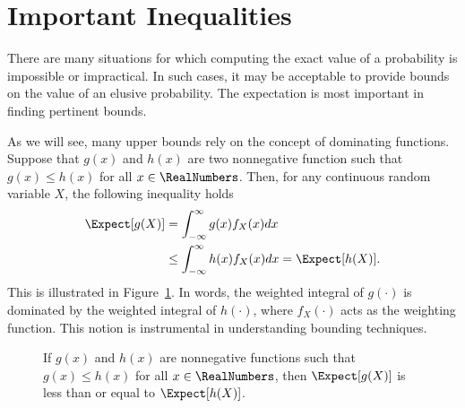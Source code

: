 \section{Important Inequalities}

There are many situations for which computing the exact value of a probability is impossible or impractical.
In such cases, it may be acceptable to provide bounds on the value of an elusive probability.
The expectation is most important in finding pertinent bounds.

As we will see, many upper bounds rely on the concept of dominating functions.
Suppose that $g(x)$ and $h(x)$ are two nonnegative function such that $g(x) \leq h(x)$ for all $x \in \RealNumbers$.
Then, for any continuous random variable $X$, the following inequality holds
\begin{equation*}
\begin{split}
\Expect [g(X)] &= \int_{-\infty}^{\infty} g(x) f_X(x) dx \\
&\leq \int_{-\infty}^{\infty} h(x) f_X (x) dx
= \Expect [h(X)] .
\end{split}
\end{equation*}
This is illustrated in Figure~\ref{figure:DominatingFcn}.
In words, the weighted integral of $g(\cdot)$ is dominated by the weighted integral of $h(\cdot)$, where $f_X (\cdot)$ acts as the weighting function.
This notion is instrumental in understanding bounding techniques.

\begin{figure}[thb]
\begin{center}
\end{center}
\caption{If $g(x)$ and $h(x)$ are nonnegative functions such that $g(x) \leq h(x)$ for all $x \in \RealNumbers$, then $\Expect [g (X)]$ is less than or equal to $\Expect [h(X)]$.}
\label{figure:DominatingFcn}
\end{figure}


